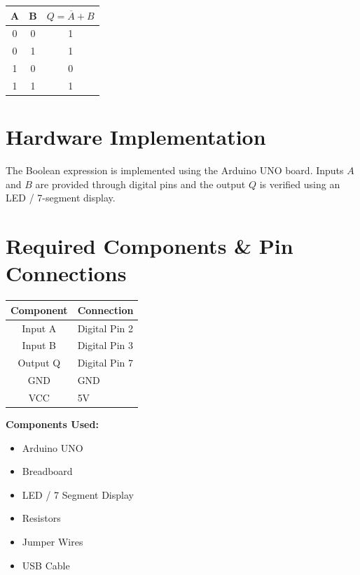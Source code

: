 \documentclass[12pt]{article}
\begin{document}
\begin{center}
\begin{tabular}{|c|c|c|}
\hline
A & B & $Q = \overline{A} + B$ \\
\hline
0 & 0 & 1 \\
0 & 1 & 1 \\
1 & 0 & 0 \\
1 & 1 & 1 \\
\hline
\end{tabular}
\end{center}


\section*{\color{blue}Hardware Implementation}

The Boolean expression is implemented using the Arduino UNO board. Inputs $A$ and $B$ are provided through digital pins and the output $Q$ is verified using an LED / 7-segment display.


\section*{\color{blue}Required Components \& Pin Connections}

\begin{center}
\begin{tabular}{|c|l|}
\hline
\textbf{Component} & \textbf{Connection} \\
\hline
Input A & Digital Pin 2 \\
Input B & Digital Pin 3 \\
Output Q & Digital Pin 7 \\
GND & GND \\
VCC & 5V \\
\hline
\end{tabular}
\end{center}

\vspace{0.3cm}

\textbf{Components Used:}

\begin{itemize}
\item Arduino UNO
\item Breadboard
\item LED / 7 Segment Display
\item Resistors
\item Jumper Wires
\item USB Cable
\end{itemize}
\end{document}
